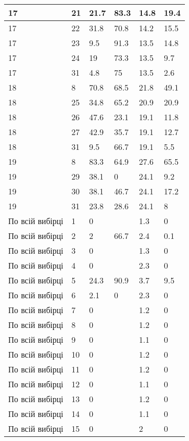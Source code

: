 \begin{longtable}[c]{ | p{2cm} | p{2cm} | p{2cm} | p{2cm} | p{3cm} | p{3cm} | }
	\hline
	17 & 21 & 21.7 & 83.3 & 14.8 & 19.4 \\
	\hline
	17 & 22 & 31.8 & 70.8 & 14.2 & 15.5 \\
	\hline
	17 & 23 & 9.5 & 91.3 & 13.5 & 14.8 \\
	\hline
	17 & 24 & 19 & 73.3 & 13.5 & 9.7 \\
	\hline
	17 & 31 & 4.8 & 75 & 13.5 & 2.6 \\
	\hline
	\hline
	\hline
	18 & 8 & 70.8 & 68.5 & 21.8 & 49.1 \\
	\hline
	18 & 25 & 34.8 & 65.2 & 20.9 & 20.9 \\
	\hline
	18 & 26 & 47.6 & 23.1 & 19.1 & 11.8 \\
	\hline
	18 & 27 & 42.9 & 35.7 & 19.1 & 12.7 \\
	\hline
	18 & 31 & 9.5 & 66.7 & 19.1 & 5.5 \\
	\hline
	\hline
	\hline
	19 & 8 & 83.3 & 64.9 & 27.6 & 65.5 \\
	\hline
	19 & 29 & 38.1 & 0 & 24.1 & 9.2 \\
	\hline
	19 & 30 & 38.1 & 46.7 & 24.1 & 17.2 \\
	\hline
	19 & 31 & 23.8 & 28.6 & 24.1 & 8 \\
	\hline
	\hline
	\hline
	По всій вибірці & 1 & 0 &  & 1.3 & 0 \\
	\hline
	По всій вибірці & 2 & 2 & 66.7 & 2.4 & 0.1 \\
	\hline
	По всій вибірці & 3 & 0 &  & 1.3 & 0 \\
	\hline
	По всій вибірці & 4 & 0 &  & 2.3 & 0 \\
	\hline
	По всій вибірці & 5 & 24.3 & 90.9 & 3.7 & 9.5 \\
	\hline
	По всій вибірці & 6 & 2.1 & 0 & 2.3 & 0 \\
	\hline
	По всій вибірці & 7 & 0 &  & 1.2 & 0 \\
	\hline
	По всій вибірці & 8 & 0 &  & 1.2 & 0 \\
	\hline
	По всій вибірці & 9 & 0 &  & 1.1 & 0 \\
	\hline
	По всій вибірці & 10 & 0 &  & 1.2 & 0 \\
	\hline
	По всій вибірці & 11 & 0 &  & 1.2 & 0 \\
	\hline
	По всій вибірці & 12 & 0 &  & 1.1 & 0 \\
	\hline
	По всій вибірці & 13 & 0 &  & 1.2 & 0 \\
	\hline
	По всій вибірці & 14 & 0 &  & 1.1 & 0 \\
	\hline
	По всій вибірці & 15 & 0 &  & 2 & 0 \\

\end{longtable}
